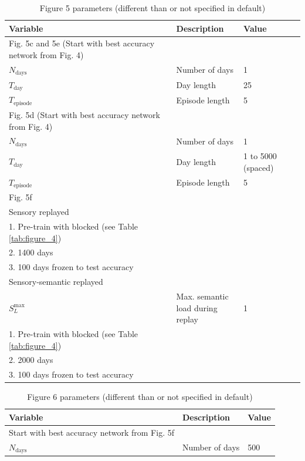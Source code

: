 \documentclass{article}
\begin{document}
\begin{table}[ht]
\centering
\caption{Figure 5 parameters (different than or not specified in default)}
\label{tab:figure_5}
\begin{tabular}{lll}
\toprule
\textbf{Variable} & \textbf{Description} & \textbf{Value} \\
\midrule
Fig. 5c and 5e (Start with best accuracy network from Fig. 4)\\
$N_\textrm{days}$ & Number of days & 1 \\
$T_\textrm{day}$ & Day length & 25 \\
$T_\textrm{episode}$ & Episode length & 5 \\
\midrule
Fig. 5d (Start with best accuracy network from Fig. 4)\\
$N_\textrm{days}$ & Number of days & 1 \\
$T_\textrm{day}$ & Day length & 1 to 5000 (spaced) \\
$T_\textrm{episode}$ & Episode length & 5 \\
\midrule
Fig. 5f \\
\midrule 
Sensory replayed \\
1. Pre-train with blocked (see Table \ref{tab:figure_4})\\
2. 1400 days\\
3. 100 days frozen to test accuracy \\
\midrule
Sensory-semantic replayed \\
$S_L^\textrm{max}$ & \makecell{Max. semantic \\ load during replay} & 1 \\
1. Pre-train with blocked (see Table \ref{tab:figure_4})\\
2. 2000 days \\
3. 100 days frozen to test accuracy \\

\bottomrule
\end{tabular}
\end{table}

\begin{table}[ht]
\centering
\caption{Figure 6 parameters (different than or not specified in default)}
\label{tab:figure_6}
\begin{tabular}{lll}
\toprule
\textbf{Variable} & \textbf{Description} & \textbf{Value} \\
\midrule
Start with best accuracy network from Fig. 5f \\
$N_\textrm{days}$ & Number of days & 500 \\
\bottomrule
\end{tabular}
\end{table}
\end{document}
